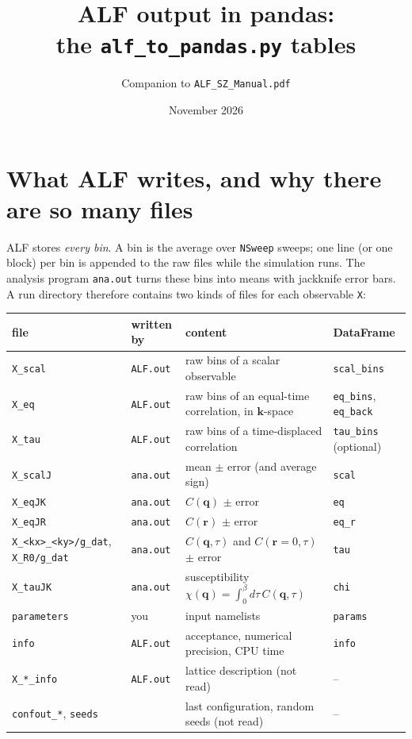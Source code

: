 \documentclass[11pt,a4paper]{article}
\title{ALF output in pandas:\\ the \texttt{alf\_to\_pandas.py} tables}
\author{Companion to \texttt{ALF\_SZ\_Manual.pdf}}
\date{November 2026}
\newcommand{\f}[1]{\texttt{#1}}
\begin{document}
\maketitle
\tableofcontents

\section{What ALF writes, and why there are so many files}

ALF stores \emph{every bin}. A bin is the average over \f{NSweep} sweeps; one line (or one
block) per bin is appended to the raw files while the simulation runs. The analysis program
\f{ana.out} turns these bins into means with jackknife error bars. A run directory therefore
contains two kinds of files for each observable \f{X}:

\begin{center}
\small
\begin{tabularx}{\textwidth}{>{\raggedright\arraybackslash}p{3.6cm}l>{\raggedright\arraybackslash}X>{\raggedright\arraybackslash}p{2.3cm}}
\toprule
file & written by & content & DataFrame \\
\midrule
\f{X\_scal}  & \f{ALF.out} & raw bins of a scalar observable & \f{scal\_bins} \\
\f{X\_eq}    & \f{ALF.out} & raw bins of an equal-time correlation, in $\mathbf k$-space & \f{eq\_bins}, \newline \f{eq\_back} \\
\f{X\_tau}   & \f{ALF.out} & raw bins of a time-displaced correlation & \f{tau\_bins} (optional) \\
\midrule
\f{X\_scalJ} & \f{ana.out} & mean $\pm$ error (and average sign) & \f{scal} \\
\f{X\_eqJK}  & \f{ana.out} & $C(\mathbf q)$ $\pm$ error & \f{eq} \\
\f{X\_eqJR}  & \f{ana.out} & $C(\mathbf r)$ $\pm$ error & \f{eq\_r} \\
\f{X\_<kx>\_<ky>/g\_dat}, \newline \f{X\_R0/g\_dat} & \f{ana.out} & $C(\mathbf q,\tau)$ and $C(\mathbf r{=}0,\tau)$ $\pm$ error & \f{tau} \\
\f{X\_tauJK} & \f{ana.out} & susceptibility $\chi(\mathbf q)=\int_0^\beta d\tau\, C(\mathbf q,\tau)$ & \f{chi} \\
\midrule
\f{parameters} & you & input namelists & \f{params} \\
\f{info}     & \f{ALF.out} & acceptance, numerical precision, CPU time & \f{info} \\
\f{X\_*\_info} & \f{ALF.out} & lattice description (not read) & -- \\
\f{confout\_*}, \f{seeds} & & last configuration, random seeds (not read) & -- \\
\bottomrule
\end{tabularx}
\end{center}
\end{document}
